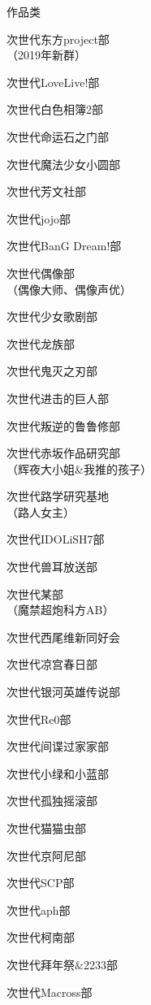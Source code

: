\begin{multicols}{3}
    \begin{categorysection}{作品类}
        \item 次世代东方project部\\（2019年新群）
        \item 次世代LoveLive!部
        \item 次世代白色相簿2部
        \item 次世代命运石之门部
        \item 次世代魔法少女小圆部
        \item 次世代芳文社部
        \item 次世代jojo部
        \item 次世代BanG Dream!部
        \item 次世代偶像部\\（偶像大师、偶像声优）
        \item 次世代少女歌剧部
        \item 次世代龙族部
        \item 次世代鬼灭之刃部
        \item 次世代进击的巨人部
        \item 次世代叛逆的鲁鲁修部
        \item 次世代赤坂作品研究部\\（辉夜大小姐\&我推的孩子）
        \item 次世代路学研究基地\\（路人女主）
        \item 次世代IDOLiSH7部
        \item 次世代兽耳放送部
        \item 次世代某部\\（魔禁超炮科方AB）
        \item 次世代西尾维新同好会
        \item 次世代凉宫春日部
        \item 次世代银河英雄传说部
        \item 次世代Re0部
        \item 次世代间谍过家家部
        \item 次世代小绿和小蓝部
        \item 次世代孤独摇滚部
        \item 次世代猫猫虫部
        \item 次世代京阿尼部
        \item 次世代SCP部
        \item 次世代aph部
        \item 次世代柯南部
        \item 次世代拜年祭\&2233部
        \item 次世代Macross部
    \end{categorysection}


\end{multicols}
